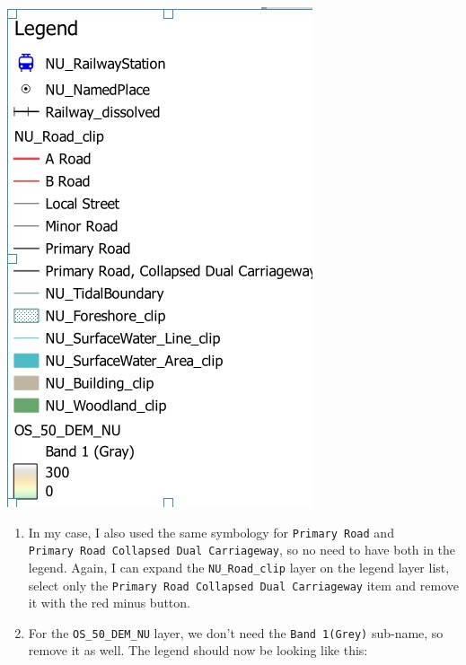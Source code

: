 \documentclass[
  letterpaper,
  DIV=11,
  numbers=noendperiod]{scrreprt}
\begin{document}
\includegraphics{images/lab_8/lab8_fig10_clean_legend.jpg}

\begin{enumerate}
\def\labelenumi{(\arabic{enumi})}
\setcounter{enumi}{242}
\item
  In my case, I also used the same symbology for \texttt{Primary\ Road}
  and \texttt{Primary\ Road\ Collapsed\ Dual\ Carriageway}, so no need
  to have both in the legend. Again, I can expand the
  \texttt{NU\_Road\_clip} layer on the legend layer list, select only
  the \texttt{Primary\ Road\ Collapsed\ Dual\ Carriageway} item and
  remove it with the red minus button.
\item
  For the \texttt{OS\_50\_DEM\_NU} layer, we don't need the
  \texttt{Band\ 1(Grey)} sub-name, so remove it as well. The legend
  should now be looking like this:
\end{enumerate}
\end{document}
